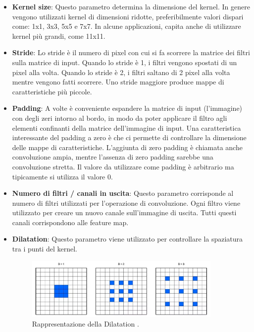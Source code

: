 \begin{itemize}
    \item \textbf{Kernel size}: Questo parametro determina la dimensione del kernel. 
    In genere vengono utilizzati kernel di dimensioni ridotte, preferibilmente 
    valori dispari come: 1x1, 3x3, 5x5 e 7x7. 
    In alcune applicazioni, capita anche di utilizzare kernel più grandi, come 11x11.
    
    \item \textbf{Stride}: Lo stride \`e il numero di pixel con cui si fa scorrere la matrice 
    dei filtri sulla matrice di input. Quando lo stride \`e 1, i filtri vengono spostati di un 
    pixel alla volta. Quando lo stride \`e 2, i filtri saltano di 2 pixel alla volta mentre 
    vengono fatti scorrere. Uno stride maggiore produce mappe di caratteristiche pi\`u piccole.

    \item \textbf{Padding}: A volte \`e conveniente espandere la matrice di input (l'immagine) con degli 
    zeri intorno al bordo, in modo da poter applicare il filtro agli elementi confinanti 
    della matrice dell'immagine di input. Una caratteristica interessante del padding a 
    zero \`e che ci permette di controllare la dimensione delle mappe di caratteristiche. 
    L'aggiunta di zero padding \`e chiamata anche convoluzione ampia, mentre l'assenza di zero 
    padding sarebbe una convoluzione stretta. 
    Il valore da utilizzare come padding \`e arbitrario ma tipicamente si utilizza il valore 0.

    \item \textbf{Numero di filtri / canali in uscita}: Questo parametro corrisponde al numero di 
    filtri utilizzati per l'operazione di convoluzione. Ogni filtro viene utilizzato per creare un
    nuovo canale sull'immagine di uscita. Tutti questi canali corrispondono alle feature map.


    \item \textbf{Dilatation}: Questo parametro viene utilizzato per controllare la spaziatura tra i 
    punti del kernel.

    \begin{figure}[H]
        \centering
        \includegraphics[width=0.9\textwidth]{Immagini/Generiche/dilatation_conv.png}
        \caption{Rappresentazione della Dilatation \cite{ASPETTI_CONVOLUZIONE_1}.}
        \label{fig:Dilatation}
    \end{figure}

\end{itemize}






